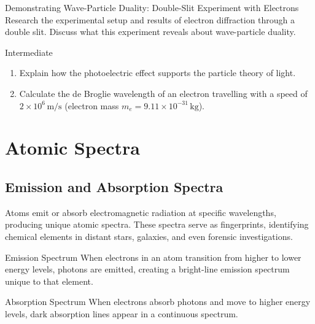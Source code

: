 \begin{investigation}{Demonstrating Wave-Particle Duality: Double-Slit Experiment with Electrons}
Research the experimental setup and results of electron diffraction through a double slit. Discuss what this experiment reveals about wave-particle duality.
\end{investigation}

\begin{tieredquestions}{Intermediate}
\begin{enumerate}
\item Explain how the photoelectric effect supports the particle theory of light.
\item Calculate the de Broglie wavelength of an electron travelling with a speed of $2\times10^{6}\,\text{m/s}$ (electron mass $m_e = 9.11\times10^{-31}\,\text{kg}$).
\end{enumerate}
\end{tieredquestions}


\FloatBarrier

\section{Atomic Spectra}
\FloatBarrier

\subsection{Emission and Absorption Spectra}
\FloatBarrier

Atoms emit or absorb electromagnetic radiation at specific wavelengths, producing unique atomic spectra. These spectra serve as fingerprints, identifying chemical elements in distant stars, galaxies, and even forensic investigations.

\begin{keyconcept}{Emission Spectrum}
When electrons in an atom transition from higher to lower energy levels, photons are emitted, creating a bright-line emission spectrum unique to that element.
\end{keyconcept}

\begin{keyconcept}{Absorption Spectrum}
When electrons absorb photons and move to higher energy levels, dark absorption lines appear in a continuous spectrum.
\end{keyconcept}

